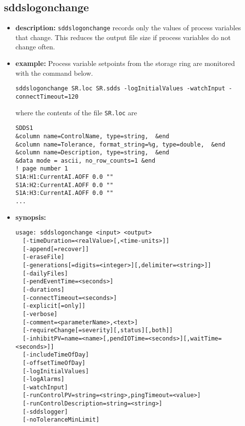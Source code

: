 %
%
\begin{latexonly}
\newpage
\end{latexonly}

%
%
\subsection{sddslogonchange}
\label{sddslogonchange}

\begin{itemize}
\item {\bf description:}
%
%
\verb+sddslogonchange+ records only the values of process variables that change. This reduces the output file size if process variables do not change often.
\item {\bf example:} 
%
% 
%
Process variable setpoints from the storage ring are monitored
with the command below.
\begin{verbatim}
sddslogonchange SR.loc SR.sdds -logInitialValues -watchInput -connectTimeout=120
\end{verbatim}
where the contents of the file \verb+SR.loc+ are
\begin{verbatim}
SDDS1
&column name=ControlName, type=string,  &end
&column name=Tolerance, format_string=%g, type=double,  &end
&column name=Description, type=string,  &end
&data mode = ascii, no_row_counts=1 &end
! page number 1
S1A:H1:CurrentAI.AOFF 0.0 ""
S1A:H2:CurrentAI.AOFF 0.0 ""
S1A:H3:CurrentAI.AOFF 0.0 ""
...
\end{verbatim}
\item {\bf synopsis:} 
%
%
\begin{verbatim}
usage: sddslogonchange <input> <output> 
  [-timeDuration=<realValue>[,<time-units>]]
  [-append[=recover]] 
  [-eraseFile]
  [-generations[=digits=<integer>][,delimiter=<string>]]
  [-dailyFiles]
  [-pendEventTime=<seconds>] 
  [-durations] 
  [-connectTimeout=<seconds>]
  [-explicit[=only]] 
  [-verbose] 
  [-comment=<parameterName>,<text>]
  [-requireChange[=severity][,status][,both]]
  [-inhibitPV=name=<name>[,pendIOTime=<seconds>][,waitTime=<seconds>]]
  [-includeTimeOfDay] 
  [-offsetTimeOfDay]
  [-logInitialValues]
  [-logAlarms]
  [-watchInput]
  [-runControlPV=string=<string>,pingTimeout=<value>]
  [-runControlDescription=string=<string>]
  [-sddslogger]
  [-noToleranceMinLimit]


\end{verbatim}
\end{itemize}

